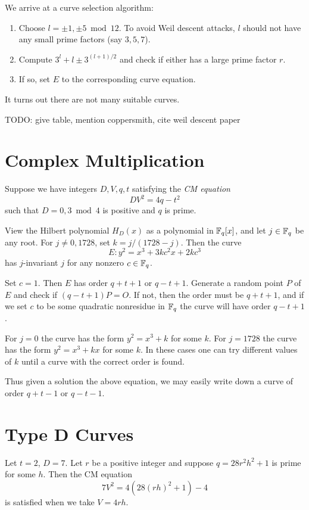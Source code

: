 We arrive at a curve selection algorithm:

\begin{enumerate}
\item
Choose $l = \pm 1, \pm 5 \bmod 12$. To avoid Weil descent attacks,
$l$ should not have any small prime factors (say $3,5,7$).
\item
Compute $3^l + l \pm 3^{(l+1)/2}$ and check if either has a large prime
factor $r$.
\item
If so, set $E$ to the corresponding curve equation.
\end{enumerate}

It turns out there are not many suitable curves.

TODO: give table, mention coppersmith, cite weil descent paper

\section {Complex Multiplication}

Suppose we have integers $D, V, q, t$ satisfying the \emph{CM equation}
\[ D V^2 = 4 q - t^2 \]
such that $D = 0, 3 \bmod 4$ is positive and $q$ is prime.

View the Hilbert polynomial $H_D(x)$ as a polynomial in $\mathbb{F}_q[x]$,
and let $j \in \mathbb{F}_q$ be any root. For $j \ne 0, 1728$, set
$k = j / (1728 - j)$. Then the curve
\[ E: y^2 = x^3 + 3 k c^2 x + 2 k c^3 \]
has $j$-invariant $j$ for any nonzero $c \in \mathbb{F}_q$.

Set $c = 1$. Then $E$ has order $q + t + 1$ or $q - t + 1$.
Generate a random point $P$ of $E$ and check if
$(q-t+1)P = O$. If not, then the order must be $q + t + 1$,
and if we set $c$ to be some quadratic nonresidue in $\mathbb{F}_q$ the
curve will have order $q - t + 1$.

For $j = 0$ the curve has the form $y^2 = x^3 + k$ for some $k$.
For $j = 1728$ the curve has the form $y^2 = x^3 + k x$ for some $k$.
In these cases one can try different values of $k$ until a curve
with the correct order is found.

Thus given a solution the above equation, we may easily write down
a curve of order $q+t-1$ or $q-t-1$.

\section {Type D Curves}

Let $t = 2$, $D = 7$. Let $r$ be a positive integer
and suppose $q = 28 r^2 h^2 + 1$ is prime for some $h$.
Then the CM equation
\[
7 V^2 = 4 (28 (r h)^2 + 1) - 4
\]
is satisfied when we take $V = 4 r h$.

